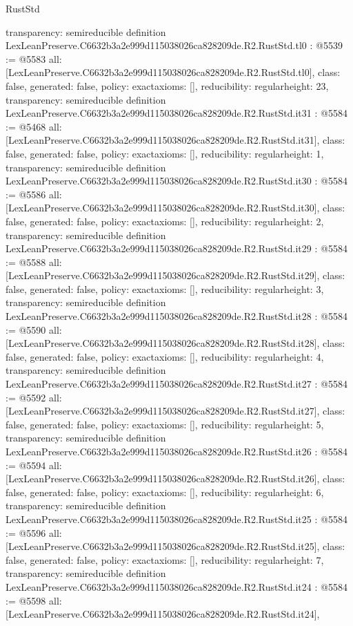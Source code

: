 \begin{lexlean}{RustStd}
\begin{coremodule}
{  transparency: semireducible
}
definition LexLeanPreserve.C6632b3a2e999d115038026ca828209de.R2.RustStd.tl0 : @5539 := @5583 {
  all: [LexLeanPreserve.C6632b3a2e999d115038026ca828209de.R2.RustStd.tl0],
  class: false,
  generated: false,
  policy: exact{axioms: []},
  reducibility: regular{height: 23},
  transparency: semireducible
}
definition LexLeanPreserve.C6632b3a2e999d115038026ca828209de.R2.RustStd.it31 : @5584 := @5468 {
  all: [LexLeanPreserve.C6632b3a2e999d115038026ca828209de.R2.RustStd.it31],
  class: false,
  generated: false,
  policy: exact{axioms: []},
  reducibility: regular{height: 1},
  transparency: semireducible
}
definition LexLeanPreserve.C6632b3a2e999d115038026ca828209de.R2.RustStd.it30 : @5584 := @5586 {
  all: [LexLeanPreserve.C6632b3a2e999d115038026ca828209de.R2.RustStd.it30],
  class: false,
  generated: false,
  policy: exact{axioms: []},
  reducibility: regular{height: 2},
  transparency: semireducible
}
definition LexLeanPreserve.C6632b3a2e999d115038026ca828209de.R2.RustStd.it29 : @5584 := @5588 {
  all: [LexLeanPreserve.C6632b3a2e999d115038026ca828209de.R2.RustStd.it29],
  class: false,
  generated: false,
  policy: exact{axioms: []},
  reducibility: regular{height: 3},
  transparency: semireducible
}
definition LexLeanPreserve.C6632b3a2e999d115038026ca828209de.R2.RustStd.it28 : @5584 := @5590 {
  all: [LexLeanPreserve.C6632b3a2e999d115038026ca828209de.R2.RustStd.it28],
  class: false,
  generated: false,
  policy: exact{axioms: []},
  reducibility: regular{height: 4},
  transparency: semireducible
}
definition LexLeanPreserve.C6632b3a2e999d115038026ca828209de.R2.RustStd.it27 : @5584 := @5592 {
  all: [LexLeanPreserve.C6632b3a2e999d115038026ca828209de.R2.RustStd.it27],
  class: false,
  generated: false,
  policy: exact{axioms: []},
  reducibility: regular{height: 5},
  transparency: semireducible
}
definition LexLeanPreserve.C6632b3a2e999d115038026ca828209de.R2.RustStd.it26 : @5584 := @5594 {
  all: [LexLeanPreserve.C6632b3a2e999d115038026ca828209de.R2.RustStd.it26],
  class: false,
  generated: false,
  policy: exact{axioms: []},
  reducibility: regular{height: 6},
  transparency: semireducible
}
definition LexLeanPreserve.C6632b3a2e999d115038026ca828209de.R2.RustStd.it25 : @5584 := @5596 {
  all: [LexLeanPreserve.C6632b3a2e999d115038026ca828209de.R2.RustStd.it25],
  class: false,
  generated: false,
  policy: exact{axioms: []},
  reducibility: regular{height: 7},
  transparency: semireducible
}
definition LexLeanPreserve.C6632b3a2e999d115038026ca828209de.R2.RustStd.it24 : @5584 := @5598 {
  all: [LexLeanPreserve.C6632b3a2e999d115038026ca828209de.R2.RustStd.it24],
}
\end{coremodule}
\end{lexlean}
